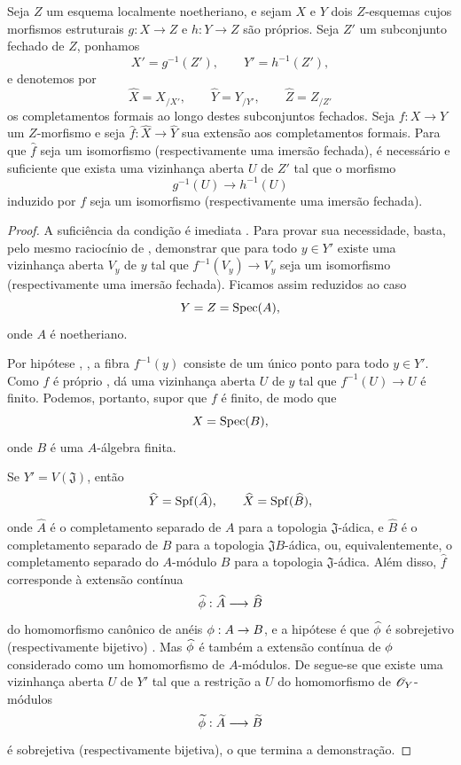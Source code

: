 \begin{proposition}[4.6.8]
\label{III.4.6.8}
Seja $Z$ um esquema localmente noetheriano, e sejam $X$ e $Y$
dois $Z$-esquemas cujos morfismos estruturais
$g:X\to Z$ e $h:Y\to Z$ são próprios. Seja $Z'$ um subconjunto fechado
de $Z$, ponhamos
\[
  X'=g^{-1}(Z'),\qquad Y'=h^{-1}(Z'),
\]
e denotemos por
\[
  \widehat X=X_{/X'},\qquad
  \widehat Y=Y_{/Y'},\qquad
  \widehat Z=Z_{/Z'}
\]
os completamentos formais ao longo destes subconjuntos fechados. Seja $f:X\to Y$
um $Z$-morfismo e seja
$\widehat f:\widehat X\to\widehat Y$ sua extensão aos completamentos
formais. Para que $\widehat f$ seja um isomorfismo
(respectivamente uma imersão fechada), é necessário e suficiente
que exista uma vizinhança aberta $U$ de $Z'$ tal que o
morfismo
\[
  g^{-1}(U)\longrightarrow h^{-1}(U)
\]
induzido por $f$ seja um isomorfismo (respectivamente uma imersão fechada).
\end{proposition}

\begin{proof}
A suficiência da condição é imediata
. Para provar sua necessidade, basta, pelo
mesmo raciocínio de , demonstrar que para todo
$y\in Y'$ existe uma vizinhança aberta $V_y$ de $y$ tal que
$f^{-1}(V_y)\to V_y$ seja um isomorfismo (respectivamente uma
imersão fechada). Ficamos assim reduzidos ao caso
\[
  Y=Z=\operatorname{Spec}(A),
\]
onde $A$ é noetheriano.

Por hipótese , , a fibra
$f^{-1}(y)$ consiste de um único ponto para todo $y\in Y'$. Como
$f$ é próprio ,  dá uma vizinhança
aberta $U$ de $y$ tal que $f^{-1}(U)\to U$ é finito. Podemos,
portanto, supor que $f$ é finito, de modo que
\[
  X=\operatorname{Spec}(B),
\]
onde $B$ é uma $A$-álgebra finita.

Se $Y'=V(\mathfrak J)$, então
\[
  \widehat Y=\operatorname{Spf}(\widehat A),
  \qquad
  \widehat X=\operatorname{Spf}(\widehat B),
\]
onde $\widehat A$ é o completamento separado de $A$ para a
topologia $\mathfrak J$-ádica, e $\widehat B$ é o completamento
separado de $B$ para a topologia $\mathfrak JB$-ádica, ou,
equivalentemente, o completamento separado do $A$-módulo $B$ para
a topologia $\mathfrak J$-ádica. Além disso, $\widehat f$
corresponde à extensão contínua
\[
  \widehat{\phi}:\widehat A\longrightarrow\widehat B
\]
do homomorfismo canônico de anéis $\vphi:A\to B$, e a
hipótese é que $\widehat{\phi}$ é sobrejetivo (respectivamente
bijetivo) . Mas $\widehat{\phi}$ é também a
extensão contínua de $\phi$ considerado como um homomorfismo de
$A$-módulos. De  segue-se que existe uma
vizinhança aberta $U$ de $Y'$ tal que a restrição a $U$ do
homomorfismo de $\mathscr{O}_Y$-módulos
\[
  \widetilde{\phi}:\widetilde A\longrightarrow\widetilde B
\]
é sobrejetiva (respectivamente bijetiva), o que termina a demonstração.
\end{proof}


